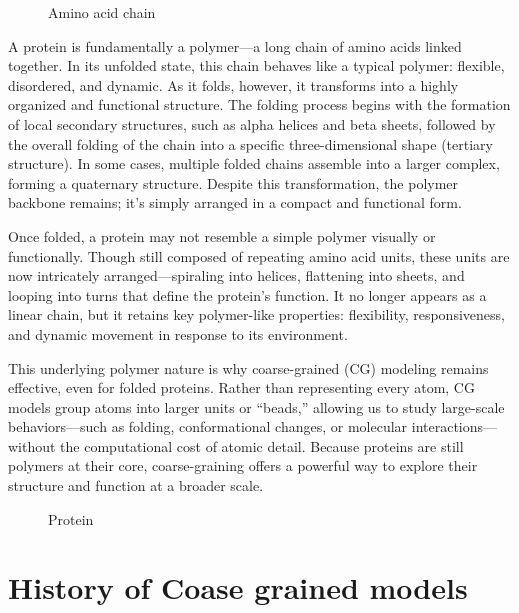 \documentclass[12pt]{article}
\begin{document}
\begin{flushleft}
\begin{figure}[!ht]
  \caption{Amino acid chain}
\end{figure}

A protein is fundamentally a polymer—a long chain of amino acids linked together. In its unfolded state, this chain behaves like a typical polymer: flexible, disordered, and dynamic. As it folds, however, it transforms into a highly organized and functional structure. The folding process begins with the formation of local secondary structures, such as alpha helices and beta sheets, followed by the overall folding of the chain into a specific three-dimensional shape (tertiary structure). In some cases, multiple folded chains assemble into a larger complex, forming a quaternary structure. Despite this transformation, the polymer backbone remains; it’s simply arranged in a compact and functional form.

Once folded, a protein may not resemble a simple polymer visually or functionally. Though still composed of repeating amino acid units, these units are now intricately arranged—spiraling into helices, flattening into sheets, and looping into turns that define the protein's function. It no longer appears as a linear chain, but it retains key polymer-like properties: flexibility, responsiveness, and dynamic movement in response to its environment.

This underlying polymer nature is why coarse-grained (CG) modeling remains effective, even for folded proteins. Rather than representing every atom, CG models group atoms into larger units or “beads,” allowing us to study large-scale behaviors—such as folding, conformational changes, or molecular interactions—without the computational cost of atomic detail. Because proteins are still polymers at their core, coarse-graining offers a powerful way to explore their structure and function at a broader scale.


\begin{figure}[!ht]
  \centering
  
  \caption{Protein}
\end{figure}






\section*{History of Coase grained models }


\end{flushleft}
\end{document}
